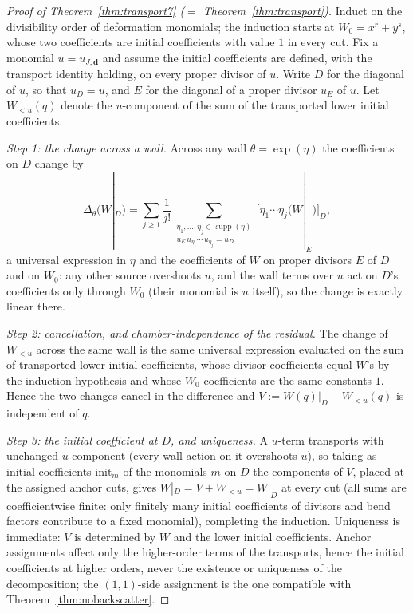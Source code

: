 \documentclass[11pt]{amsart}
\theoremstyle{definition}
\theoremstyle{remark}
\begin{document}
\begin{proof}[Proof of Theorem~\ref{thm:transport7} ($=$ Theorem~\ref{thm:transport})]
Induct on the divisibility order of deformation monomials; the induction
starts at $W_{0}=x^{r}+y^{s}$, whose two coefficients are initial coefficients
with value $1$ in every cut. Fix a monomial $u=u_{J,\mathbf d}$ and assume the
initial coefficients are defined,
with the transport identity holding, on every proper divisor of $u$. Write
$D$ for the diagonal of $u$, so that $u_{D}=u$, and $E$ for the diagonal of a
proper divisor $u_{E}$ of $u$. Let
$W_{<u}(q)$ denote the $u$-component of the sum of the transported lower
initial coefficients.

\emph{Step 1: the change across a wall.}
Across any wall $\theta=\exp(\eta)$ the coefficients on $D$ change by
\[
\Delta_{\theta}\bigl(W|_{D}\bigr)
=\sum_{j\ge1}\frac1{j!}
\sum_{\substack{\eta_{1},\dots,\eta_{j}\in\operatorname{supp}(\eta)\\
u_{E}\,u_{\eta_{1}}\cdots\,u_{\eta_{j}}=u_{D}}}
\bigl[\eta_{1}\cdots \eta_{j}\bigl(W|_{E}\bigr)\bigr]_{D},
\]
a universal expression in $\eta$ and the coefficients of $W$ on
proper divisors $E$ of $D$ and on $W_{0}$: any other source overshoots
$u$, and the wall terms over $u$ act on $D$'s coefficients only through $W_{0}$
(their monomial is $u$ itself), so the change is exactly linear there.

\emph{Step 2: cancellation, and chamber-independence of the residual.}
The change of $W_{<u}$ across the same wall is the same universal expression
evaluated on the sum of transported lower initial coefficients, whose divisor
coefficients equal
$W$'s by the induction hypothesis and whose $W_{0}$-coefficients are the same
constants $1$. Hence the two changes cancel in the difference and
$V:=W(q)|_{D}-W_{<u}(q)$ is independent of $q$.

\emph{Step 3: the initial coefficient at $D$, and uniqueness.}
A $u$-term transports with unchanged
$u$-component (every wall action on it overshoots $u$), so taking as initial
coefficients $\mathrm{init}_m$ of the monomials $m$ on $D$ the components of
$V$, placed at the assigned anchor cuts, gives
$\widetilde W|_{D}=V+W_{<u}=W|_{D}$ at every cut (all sums are coefficientwise finite: only
finitely many initial coefficients of divisors and bend factors contribute to
a fixed monomial),
completing the induction. Uniqueness is
immediate: $V$ is determined by $W$ and the lower initial coefficients. Anchor
assignments affect only the higher-order terms of the transports, hence the
initial coefficients at higher orders, never the existence or uniqueness of the decomposition; the
$(1,1)$-side assignment is the one compatible with
Theorem~\ref{thm:nobackscatter}.
\end{proof}
\end{document}
